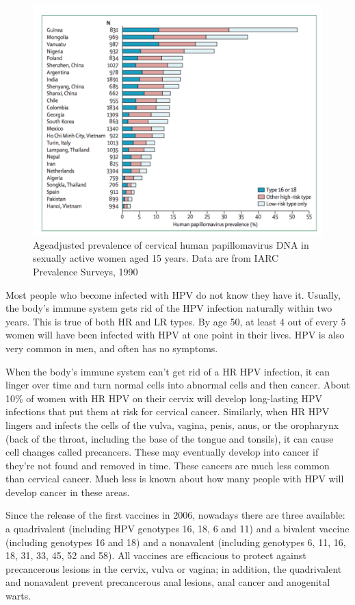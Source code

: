 \begin{figure}[ht]
	\centering
	\includegraphics[scale=0.7]{IMG/prevalence.png}
	\caption{Age\-adjusted prevalence of cervical human papillomavirus DNA in sexually active women aged 15 years. Data are from IARC Prevalence Surveys, 1990}
	\label{zurHausen}
\end{figure} 


Most people who become infected with HPV do not know they have it. Usually, the body's immune system gets rid of the HPV infection naturally within two years. This is true of both HR and LR types. By age 50, at least 4 out of every 5 women will have been infected with HPV at one point in their lives. HPV is also very common in men, and often has no symptoms.

When the body's immune system can't get rid of a HR HPV infection, it can linger over time and turn normal cells into abnormal cells and then cancer. About 10\% of women with HR HPV on their cervix will develop long-lasting HPV infections that put them at risk for cervical cancer. Similarly, when HR HPV lingers and infects the cells of the vulva, vagina, penis, anus, or the oropharynx (back of the throat, including the base of the tongue and tonsils), it can cause cell changes called precancers. These may eventually develop into cancer if they're not found and removed in time. These cancers are much less common than cervical cancer. Much less is known about how many people with HPV will develop cancer in these areas.

Since the release of the first vaccines in 2006, nowadays there are three available: a quadrivalent (including HPV genotypes 16, 18, 6 and 11) and a bivalent vaccine (including genotypes 16 and 18) and a nonavalent (including genotypes 6, 11, 16, 18, 31, 33, 45, 52 and 58). All vaccines are efficacious to protect against precancerous lesions in the cervix, vulva or vagina; in addition, the quadrivalent and nonavalent prevent precancerous anal lesions, anal cancer and anogenital warts.


